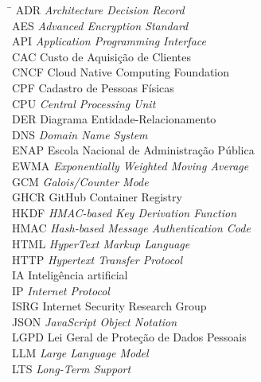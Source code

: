 \newpage
{}
\printlist{\listoffigures}

\newpage
{}
\printlist{\listoftables}

\newpage
{}
\printlist{\listofdatatables}

\newpage
{}

\begin{tabbing}
    \hspace{3cm}\=\kill
    ADR \> \textit{Architecture Decision Record}\\
    AES \> \textit{Advanced Encryption Standard}\\
    API \> \textit{Application Programming Interface}\\
    CAC \> Custo de Aquisição de Clientes\\
    CNCF \> Cloud Native Computing Foundation\\
    CPF \> Cadastro de Pessoas Físicas\\
    CPU \> \textit{Central Processing Unit}\\
    DER \> Diagrama Entidade-Relacionamento\\
    DNS \> \textit{Domain Name System}\\
    ENAP \> Escola Nacional de Administração Pública\\
    EWMA \> \textit{Exponentially Weighted Moving Average}\\
    GCM \> \textit{Galois/Counter Mode}\\
    GHCR \> GitHub Container Registry\\
    HKDF \> \textit{HMAC-based Key Derivation Function}\\
    HMAC \> \textit{Hash-based Message Authentication Code}\\
    HTML \> \textit{HyperText Markup Language}\\
    HTTP \> \textit{Hypertext Transfer Protocol}\\
    IA \> Inteligência artificial\\
    IP \> \textit{Internet Protocol}\\
    ISRG \> Internet Security Research Group\\
    JSON \> \textit{JavaScript Object Notation}\\
    LGPD \> Lei Geral de Proteção de Dados Pessoais\\
    LLM \> \textit{Large Language Model}\\
    LTS \> \textit{Long-Term Support}\\

\end{tabbing}

